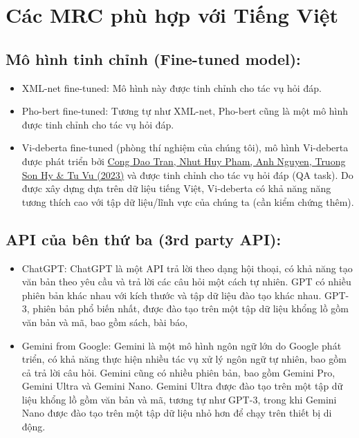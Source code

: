 \section{Các MRC phù hợp với Tiếng Việt}\label{sec:cac-mrc-phu-hop-voi-tieng-viet}
\subsection{Mô hình tinh chỉnh (Fine-tuned model):}\label{subsec:mo-hinh-tinh-chinh-(fine-tuned-model):}
\begin{itemize}
    \item XML-net fine-tuned: Mô hình này được tinh chỉnh cho tác vụ hỏi đáp.
    \item Pho-bert fine-tuned: Tương tự như XML-net, Pho-bert cũng là một mô hình được tinh chỉnh cho tác vụ hỏi đáp.
    \item Vi-deberta fine-tuned (phòng thí nghiệm của chúng tôi), mô hình Vi-deberta được phát triển bởi
        \href{https://arxiv.org/pdf/2301.10439}{Cong Dao Tran, Nhut Huy Pham, Anh Nguyen, Truong Son Hy & Tu Vu (2023)}
        và được tinh chỉnh cho tác vụ hỏi đáp (QA task). Do được xây dựng dựa trên dữ liệu tiếng Việt, Vi-deberta có khả năng năng tương thích cao với tập dữ liệu/lĩnh vực của chúng ta (cần kiểm chứng thêm).
\end{itemize}
\subsection{API của bên thứ ba (3rd party API):}\label{subsec:api-cua-ben-thu-ba-(3rd-party-api):}
\begin{itemize}
    \item
        ChatGPT: ChatGPT là một API trả lời theo dạng hội thoại, có khả năng tạo văn bản theo yêu cầu và trả lời các câu hỏi một cách tự nhiên.
        GPT có nhiều phiên bản khác nhau với kích thước và tập dữ liệu đào tạo khác nhau. GPT-3, phiên bản phổ biến nhất, được đào tạo trên một tập dữ liệu khổng lồ gồm văn bản và mã, bao gồm sách, bài báo,
    \item
        Gemini from Google: Gemini là một mô hình ngôn ngữ lớn do Google phát triển, có khả năng thực hiện nhiều tác vụ xử lý ngôn ngữ tự nhiên, bao gồm cả trả lời câu hỏi.
        Gemini cũng có nhiều phiên bản, bao gồm Gemini Pro, Gemini Ultra và Gemini Nano. Gemini Ultra được đào tạo trên một tập dữ liệu khổng lồ gồm văn bản và mã, tương tự như GPT-3, trong khi Gemini Nano được đào tạo trên một tập dữ liệu nhỏ hơn để chạy trên thiết bị di động.
\end{itemize}

